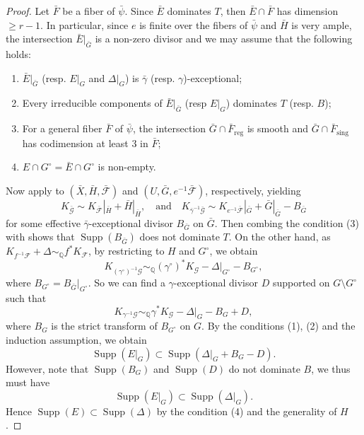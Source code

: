 \documentclass[12pt,twoside]{amsart}
\DeclareMathOperator{\Supp}{Supp}
\DeclareMathOperator{\reg}{reg}
\theoremstyle{definition}
\begin{document}
\begin{proof}
	Let $\bar{F}$ be a fiber of $\bar{\psi}$. Since $\bar{E}$ dominates $T$, then $\bar{E}\cap \bar{F}$ has dimension $\geq r-1$. In particular, since $e$ is finite over the fibers of $\bar{\psi}$ and $\bar{H}$ is very ample, the intersection $\bar{E}|_{\bar{G}}$ is a non-zero divisor and we may assume that the following holds:
	\begin{enumerate}
		\item $\bar{E}|_{\bar{G}}$ (resp. $E|_{G}$ and $\Delta|_G$) is $\bar{\gamma}$ (resp. $\gamma$)-exceptional;
		
		\item Every irreducible components of $\bar{E}|_{\bar{G}}$ (resp $E|_G$) dominates $T$ (resp. $B$);
		
		\item For a general fiber $\bar{F}$ of $\bar{\psi}$, the intersection $\bar{G}\cap \bar{F}_{\reg}$ is smooth and $\bar{G}\cap \bar{F}_{\textrm{sing}}$ has codimension at least $3$ in $\bar{F}$;
		
		\item  $E\cap G^{\circ}=\bar{E}\cap G^{\circ}$ is non-empty.
	\end{enumerate}
	Now apply \cite[Proposition 3.6(3) and (1)]{Druel2021} to $(\bar{X},\bar{H},\bar{\mathcal{F}})$ and $(U,\bar{G},e^{-1}\bar{\mathcal{F}})$, respectively, yielding
	\[
	K_{\bar{\mathcal{G}}} \sim K_{\bar{\mathcal{F}}}|_{\bar{H}} + \bar{H}|_{\bar{H}}, \quad \text{and} \quad
	K_{\bar{\gamma}^{-1}\bar{\mathcal{G}}} \sim K_{e^{-1}\bar{\mathcal{F}}}|_{\bar{G}} + \bar{G}|_{\bar{G}} - B_{\bar{G}}
	\]
	for some effective $\bar{\gamma}$-exceptional divisor $B_{\bar{G}}$ on $\bar{G}$.  Then combing the condition (3) with \cite[Proposition 3.6(1)]{Druel2021} shows that $\Supp(B_{\bar{G}})$ does not dominate $T$. On the other hand, as $K_{f^{-1}\mathcal{F}}+\Delta \sim_{\mathbb{Q}} f^*K_{\mathcal{F}}$, by restricting to $H$ and $G^{\circ}$, we obtain
	\[
	K_{(\gamma^{\circ})^{-1}\mathcal{G}} \sim_{\mathbb{Q}} (\gamma^{\circ})^* K_{\mathcal{G}} - \Delta|_{G^{\circ}} - B_{G^{\circ}},
	\]
	where $B_{G^{\circ}}=B_{\bar{G}}|_{G^{\circ}}$. So we can find a $\gamma$-exceptional divisor $D$ supported on $G\setminus G^{\circ}$ such that
	\[
	K_{\gamma^{-1}\mathcal{G}} \sim_{\mathbb{Q}} \gamma^* K_{\mathcal{G}} - \Delta|_G - B_{G} + D,
	\]
	where $B_G$ is the strict transform of $B_{G^{\circ}}$ on $G$. By the conditions (1), (2) and the induction assumption, we obtain 
	\[
	\Supp(E|_G) \subset \Supp(\Delta|_G + B_G - D).
	\]
	However, note that $\Supp(B_G)$ and $\Supp(D)$ do not dominate $B$, we thus must have
	\[
	\Supp(E|_G)\subset \Supp(\Delta|_G).
	\]
	Hence $\Supp(E)\subset \Supp(\Delta)$ by the condition (4) and the generality of $H$.
\end{proof}
	
\end{document}
